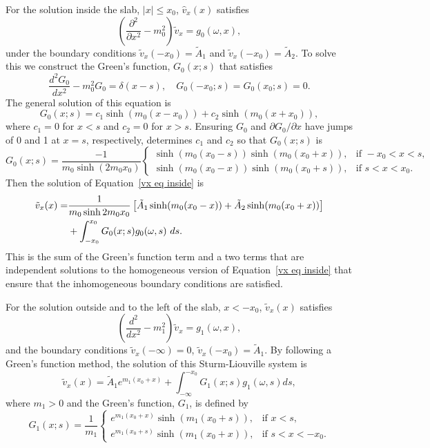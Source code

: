 For the solution inside the slab, $|x| \leq x_0$, $\widehat{v}_x(x)$ satisfies
\begin{equation}
\left( \frac{\partial^2}{\partial x^2} - m_0^2 \right) \tilde{v}_x = g_0(\omega, x), \label{vx eq inside}
\end{equation}
under the boundary conditions $\tilde{v}_x(-x_0) = \tilde{A}_1$ and $\tilde{v}_x(-x_0) = \tilde{A}_2$. To solve this we construct the Green's function, $G_0(x;s)$ that satisfies
\begin{equation}
\frac{d^2G_0}{dx^2} - m_0^2 G_0 = \delta(x-s), \quad G_0(-x_0;s) = G_0(x_0;s) = 0.
\end{equation}
The general solution of this equation is
\begin{equation}
G_0(x;s) = c_1\sinh(m_0(x - x_0)) + c_2\sinh(m_0(x + x_0)),
\end{equation}
where $c_1 = 0$ for $x < s$ and $c_2 = 0$ for $x > s$. Ensuring $G_0$ and $\partial G_0 / \partial x$ have jumps of 0 and 1 at $x = s$, respectively, determines $c_1$ and $c_2$ so that $G_0(x;s)$ is
\begin{equation}
G_0(x;s) = \frac{-1}{m_0\sinh(2m_0 x_0)}
\begin{cases}
\sinh(m_0(x_0 - s))\sinh(m_0(x_0 + x)), & \text{if } -x_0<x<s, \\
\sinh(m_0(x_0 - x))\sinh(m_0(x_0 + s)), & \text{if } s<x<x_0.
\end{cases}
\end{equation}
Then the solution of Equation~\eqref{vx eq inside} is
\begin{align}
\tilde{v}_x(x) = &\frac{1}{m_0\sinh{2m_0 x_0}} \left[ \tilde{A}_1\sinh(m_0(x_0 - x)) + \tilde{A}_2\sinh(m_0(x_0 + x)) \right] \notag \\
&+ \int_{-x_0}^{x_0} G_0(x;s) g_0(\omega, s) ~ds.
\label{V sol 0}
\end{align}
This is the sum of the Green's function term and a two terms that are independent solutions to the homogeneous version of Equation~\eqref{vx eq inside} that ensure that the inhomogeneous boundary conditions are satisfied.

For the solution outside and to the left of the slab, $x < -x_0$, $\tilde{v}_x(x)$ satisfies
\begin{equation}
\left(\frac{d^2}{dx^2} - m_1^2 \right) \tilde{v}_x = g_1(\omega, x),
\end{equation}
and the boundary conditions $\tilde{v}_x(-\infty) = 0$, $\tilde{v}_x(-x_0) = \tilde{A}_1$. By following a Green's function method, the solution of this Sturm-Liouville system is
\begin{equation}
\tilde{v}_x(x) = \tilde{A}_1e^{m_1(x_0+x)} + \int_{-\infty}^{-x_0} G_1(x; s) g_1(\omega, s) ds,
\label{V sol 1}
\end{equation}
where $m_1 > 0$ and the Green's function, $G_1$, is defined by
\begin{equation}
G_1(x; s) = \frac{1}{m_1}
\begin{cases}
e^{m_1(x_0 + x)}\sinh(m_1(x_0 + s)), & \text{if } x < s, \\
e^{m_1(x_0 + s)}\sinh(m_1(x_0 + x)), & \text{if } s < x < -x_0.
\end{cases}
\end{equation}

